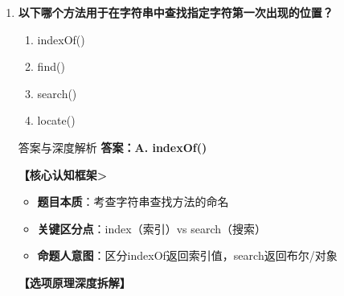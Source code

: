 \documentclass[12pt, a4paper]{ctexart}
\begin{document}
\begin{enumerate}[label=\textbf{\arabic*.}]
\begin{bluebox}{答案与深度解析}
		      \textbf{【应背诵知识点>}
		      \begin{itemize}[label={}, nosep]
			      \item endsWith(suffix)：判断以suffix结束
			      \item start/End + With + s 背诵公式
		      \end{itemize}

		      \textbf{【命题趋势与实战策略】}

		      \textbf{考场秒杀}：以后缀结束→endsWith()
		      \textbf{记忆技巧}：Start开始End结束，一对好基友一起记
	      \end{bluebox}

	      \vspace{1em}

	\item \textbf{以下哪个方法用于在字符串中查找指定字符第一次出现的位置？}
	      \begin{enumerate}[label=\Alph*.]
		      \item indexOf()
		      \item find()
		      \item search()
		      \item locate()
	      \end{enumerate}

	      \begin{bluebox}{答案与深度解析}
		      \textbf{答案：A. indexOf()}

		      \textbf{【核心认知框架>}
		      \begin{itemize}[label={}, leftmargin=*, nosep]
			      \item \textbf{题目本质}：考查字符串查找方法的命名
			      \item \textbf{关键区分点}：index（索引）vs search（搜索）
			      \item \textbf{命题人意图}：区分indexOf返回索引值，search返回布尔/对象
		      \end{itemize}

		      \textbf{【选项原理深度拆解】}


\end{bluebox}
\end{enumerate}
\end{document}
